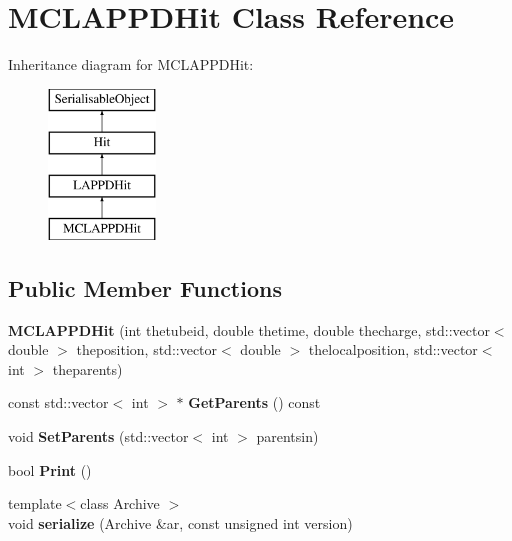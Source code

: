 \hypertarget{classMCLAPPDHit}{\section{M\-C\-L\-A\-P\-P\-D\-Hit Class Reference}
\label{classMCLAPPDHit}
}
Inheritance diagram for M\-C\-L\-A\-P\-P\-D\-Hit\-:\begin{figure}[H]
\begin{center}
\leavevmode
\includegraphics[height=4.000000cm]{classMCLAPPDHit}
\end{center}
\end{figure}
\subsection*{Public Member Functions}
\begin{DoxyCompactItemize}
\item 
\hypertarget{classMCLAPPDHit_ae070e6fd084dffe72b24257fb10eae53}{{\bfseries M\-C\-L\-A\-P\-P\-D\-Hit} (int thetubeid, double thetime, double thecharge, std\-::vector$<$ double $>$ theposition, std\-::vector$<$ double $>$ thelocalposition, std\-::vector$<$ int $>$ theparents)}\label{classMCLAPPDHit_ae070e6fd084dffe72b24257fb10eae53}

\item 
\hypertarget{classMCLAPPDHit_a2cd53e715b43962eece869e296f0efdb}{const std\-::vector$<$ int $>$ $\ast$ {\bfseries Get\-Parents} () const }\label{classMCLAPPDHit_a2cd53e715b43962eece869e296f0efdb}

\item 
\hypertarget{classMCLAPPDHit_a1edf49747c6858e203a3185ec0f656a4}{void {\bfseries Set\-Parents} (std\-::vector$<$ int $>$ parentsin)}\label{classMCLAPPDHit_a1edf49747c6858e203a3185ec0f656a4}

\item 
\hypertarget{classMCLAPPDHit_a90639fe126043eeb4222860265d0e3c5}{bool {\bfseries Print} ()}\label{classMCLAPPDHit_a90639fe126043eeb4222860265d0e3c5}

\item 
\hypertarget{classMCLAPPDHit_a1f0112b487a84fdc753c76bd3429bc06}{{\footnotesize template$<$class Archive $>$ }\\void {\bfseries serialize} (Archive \&ar, const unsigned int version)}\label{classMCLAPPDHit_a1f0112b487a84fdc753c76bd3429bc06}

\end{DoxyCompactItemize}
